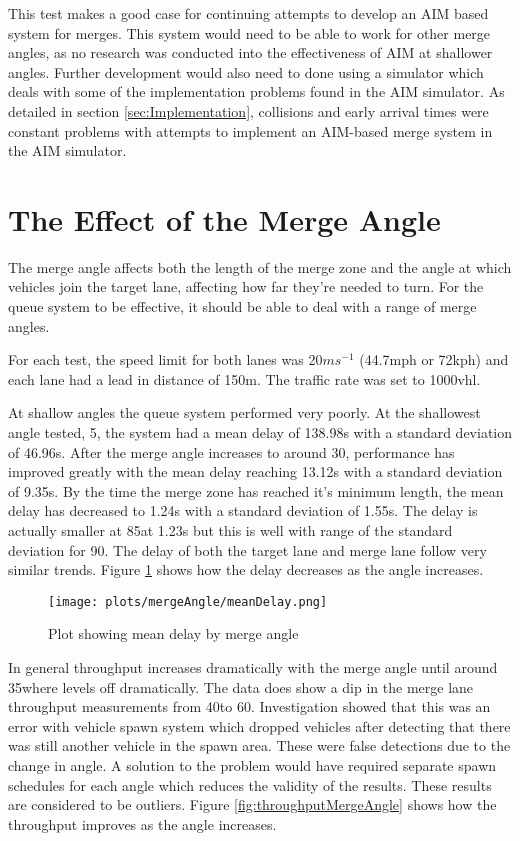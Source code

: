 This test makes a good case for continuing attempts to develop an AIM based system for merges. This system would need to be able to work for other merge angles, as no research was conducted into the effectiveness of AIM at shallower angles. Further development would also need to done using a simulator which deals with some of the implementation problems found in the AIM simulator. As detailed in section \ref{sec:Implementation}, collisions and early arrival times were constant problems with attempts to implement an AIM-based merge system in the AIM simulator.

\section{The Effect of the Merge Angle}
\label{sec:The Effect of the Merge Angle}
The merge angle affects both the length of the merge zone and the angle at which vehicles join the target lane, affecting how far they're needed to turn. For the queue system to be effective, it should be able to deal with a range of merge angles.

For each test, the speed limit for both lanes was 20$\si{ms^{-1}}$ (44.7\si{mph} or 72\si{kph}) and each lane had a lead in distance of 150\si{m}. The traffic rate was set to 1000\si{vhl}.

At shallow angles the queue system performed very poorly. At the shallowest angle tested, 5\degree, the system had a mean delay of 138.98\si{s} with a standard deviation of 46.96\si{s}. After the merge angle increases to around 30\degree, performance has improved greatly with the mean delay reaching 13.12\si{s} with a standard deviation of 9.35\si{s}. By the time the merge zone has reached it's minimum length, the mean delay has decreased to 1.24\si{s} with a standard deviation of 1.55\si{s}. The delay is actually smaller at 85\degree at 1.23\si{s} but this is well with range of the standard deviation for 90\degree. The delay of both the target lane and merge lane follow very similar trends. Figure \ref{fig:meanDelayMergeAngle} shows how the delay decreases as the angle increases.

\begin{figure}[htb]
\texttt{[image: plots/mergeAngle/meanDelay.png]}
\caption{Plot showing mean delay by merge angle}
\label{fig:meanDelayMergeAngle}
\end{figure}

In general throughput increases dramatically with the merge angle until around 35\degree where levels off dramatically. The data does show a dip in the merge lane throughput measurements from 40\degree to 60\degree. Investigation showed that this was an error with vehicle spawn system which dropped vehicles after detecting that there was still another vehicle in the spawn area. These were false detections due to the change in angle. A solution to the problem would have required separate spawn schedules for each angle which reduces the validity of the results. These results are considered to be outliers. Figure \ref{fig:throughputMergeAngle} shows how the throughput improves as the angle increases.

